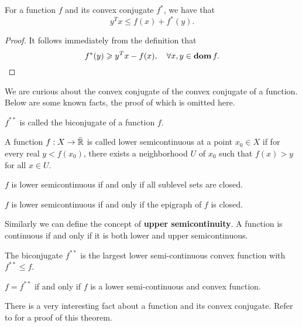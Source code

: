 \documentclass[12pt]{article}
\begin{document}
\begin{theorem}
    For a function \(f\) and its convex conjugate \(f^\ast\), we have that
    \[y^Tx\leqslant f(x)+f^\ast(y).\]
\end{theorem}
\begin{proof}
    It follows immediately from the definition that
    \[f^\ast(y)\geqslant y^Tx-f(x),\quad\forall x,y\in\operatorname{\mathbf{dom}} f.\]
\end{proof}

We are curious about the convex conjugate of the convex conjugate of a function. Below are some known facts, the proof of which is omitted here.

\begin{definition}[Biconjugate]
    \(f^{\ast\ast}\) is called the \textnormal{biconjugate} of a function \(f\).
\end{definition}

\begin{definition}
    A function \(f:X\to\bar{\mathbb R}\) is called \textnormal{lower semicontinuous} at a point \(x_0\in X\) if for every real \(y<f(x_0)\), there exists a neighborhood \(U\) of \(x_0\) such that \(f(x)>y\) for all \(x\in U\).
\end{definition}

\begin{remark}
    \(f\) is lower semicontinuous if and only if all sublevel sets are closed.
\end{remark}

\begin{remark}
    \(f\) is lower semicontinuous if and only if the epigraph of \(f\) is closed.
\end{remark}

Similarly we can define the concept of \textbf{upper semicontinuity}. A function is continuous if and only if it is both lower and upper semicontinuous.

\begin{proposition}
    The biconjugate \(f^{\ast\ast}\) is the largest lower semi-continuous convex function with \(f^{\ast\ast}\leqslant f\).
\end{proposition}

\begin{theorem}
    \(f=f^{\ast\ast}\) if and only if \(f\) is a lower semi-continuous and convex function.
\end{theorem}

There is a very interesting fact about a function and its convex conjugate. Refer to \cite{zhou2018fenchel} for a proof of this theorem.
\end{document}
